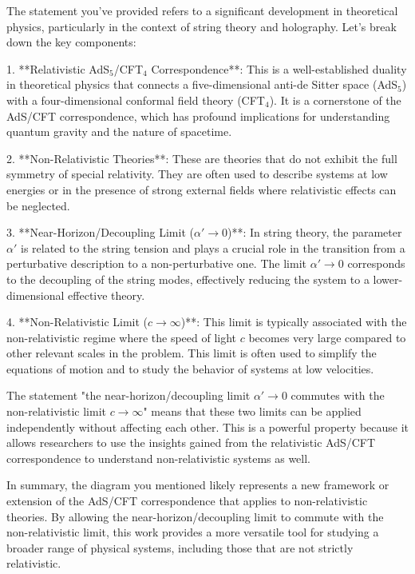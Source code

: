 The statement you've provided refers to a significant development in theoretical physics, particularly in the context of string theory and holography. Let's break down the key components:

1. **Relativistic AdS$_5$/CFT$_4$ Correspondence**: This is a well-established duality in theoretical physics that connects a five-dimensional anti-de Sitter space (AdS$_5$) with a four-dimensional conformal field theory (CFT$_4$). It is a cornerstone of the AdS/CFT correspondence, which has profound implications for understanding quantum gravity and the nature of spacetime.

2. **Non-Relativistic Theories**: These are theories that do not exhibit the full symmetry of special relativity. They are often used to describe systems at low energies or in the presence of strong external fields where relativistic effects can be neglected.

3. **Near-Horizon/Decoupling Limit ($\alpha' \to 0$)**: In string theory, the parameter $\alpha'$ is related to the string tension and plays a crucial role in the transition from a perturbative description to a non-perturbative one. The limit $\alpha' \to 0$ corresponds to the decoupling of the string modes, effectively reducing the system to a lower-dimensional effective theory.

4. **Non-Relativistic Limit ($c \to \infty$)**: This limit is typically associated with the non-relativistic regime where the speed of light $c$ becomes very large compared to other relevant scales in the problem. This limit is often used to simplify the equations of motion and to study the behavior of systems at low velocities.

The statement "the near-horizon/decoupling limit $\alpha' \to 0$ commutes with the non-relativistic limit $c \to \infty$" means that these two limits can be applied independently without affecting each other. This is a powerful property because it allows researchers to use the insights gained from the relativistic AdS/CFT correspondence to understand non-relativistic systems as well.

In summary, the diagram you mentioned likely represents a new framework or extension of the AdS/CFT correspondence that applies to non-relativistic theories. By allowing the near-horizon/decoupling limit to commute with the non-relativistic limit, this work provides a more versatile tool for studying a broader range of physical systems, including those that are not strictly relativistic.